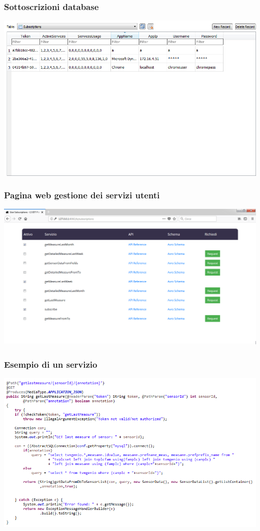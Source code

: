 \documentclass{beamer}
\begin{document}
\begin{frame}
\frametitle{Sottoscrizioni database}
\includegraphics[width=1\textwidth]{images/DBPlatform3.png}
\end{frame}

\begin{frame}
\frametitle{Pagina web gestione dei servizi utenti}
\includegraphics[width=1\textwidth]{images/UserSubscriptionsPlatform.png}
\end{frame}

\begin{frame}
\frametitle{Esempio di un servizio}
\includegraphics[width=1\textwidth]{images/getlastmeasure.png}
\end{frame}
\end{document}
